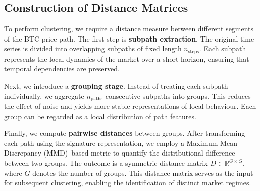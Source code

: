 \subsection{Construction of Distance Matrices}

To perform clustering, we require a distance measure between different segments of the BTC price path. 
The first step is \textbf{subpath extraction}. The original time series is divided into overlapping subpaths of fixed length $n_{\text{steps}}$. Each subpath represents the local dynamics of the market over a short horizon, ensuring that temporal dependencies are preserved.

Next, we introduce a \textbf{grouping stage}. Instead of treating each subpath individually, we aggregate $n_{\text{paths}}$ consecutive subpaths into groups. This reduces the effect of noise and yields more stable representations of local behaviour. Each group can be regarded as a local distribution of path features.

Finally, we compute \textbf{pairwise distances} between groups. After transforming each path using the signature representation, we employ a Maximum Mean Discrepancy (MMD)–based metric to quantify the distributional difference between two groups. The outcome is a symmetric distance matrix $D \in \mathbb{R}^{G \times G}$, where $G$ denotes the number of groups. This distance matrix serves as the input for subsequent clustering, enabling the identification of distinct market regimes.